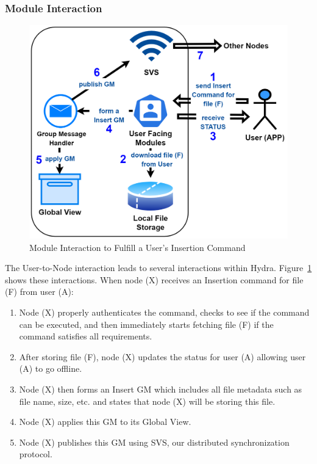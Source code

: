 \subsubsection{Module Interaction}
\begin{figure}[!ht]
    \centering
    \includegraphics[width=\columnwidth]{visuals/insert-sys.png}
    \caption{Module Interaction to Fulfill a User's Insertion Command}
    \label{fig:insert-sys}
\end{figure}

The User-to-Node interaction leads to several interactions within Hydra.%
Figure~\ref{fig:insert-sys} shows these interactions. When node (X) receives an Insertion command for file (F) from user (A):
\begin{enumerate}
    \item Node (X) properly authenticates the command, checks to see if the command can be executed, and then immediately starts fetching file (F) if the command satisfies all requirements.
    \item After storing file (F), node (X) updates the status for user (A) allowing user (A) to go offline.
    \item Node (X) then forms an Insert GM which includes all file metadata such as file name, size, etc. and states that node (X) will be storing this file.
    \item Node (X) applies this GM to its Global View.
    \item Node (X) publishes this GM using SVS, our distributed synchronization protocol.
\end{enumerate}


